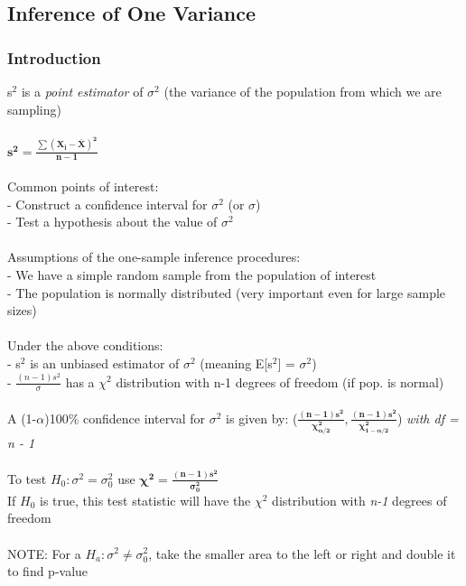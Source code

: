 \documentclass[12pt, a4paper]{article}
\begin{document}
	\subsection{Inference of One Variance}
	\subsubsection{Introduction}
	s$^2$ is a \textit{point estimator} of $\sigma^2$ (the variance of the population from which we are sampling) \\~\\
	\large $\bm{s^2 = \frac{\sum(X_i-\bar{X})^2}{n-1}}$ \normalsize \\~\\
	Common points of interest: \\
	- Construct a confidence interval for $\sigma^2$ (or $\sigma$) \\
	- Test a hypothesis about the value of $\sigma^2$ \\~\\
	Assumptions of the one-sample inference procedures: \\
	- We have a simple random sample from the population of interest \\
	- The population is normally distributed (very important even for large sample sizes) \\~\\
	Under the above conditions: \\
	- s$^2$ is an unbiased estimator of $\sigma^2$ (meaning E[s$^2$] = $\sigma^2$) \\
	- $\frac{(n-1)s^2}{\sigma}$ has a $\chi^2$ distribution with n-1 degrees of freedom (if pop. is normal) \\~\\
	A (1-$\alpha$)100\% confidence interval for $\sigma^2$ is given by: \large ($\bm{\frac{(n-1)s^2}{\chi^2_{\alpha/2}}, \frac{(n-1)s^2}{\chi^2_{1-\alpha/2}}}$) \normalsize \textit{with df = n - 1}\\~\\
	To test $H_0: \sigma^2 = \sigma^2_0$ use $\bm{\chi^2 = \frac{(n-1)s^2}{\sigma^2_0}}$ \\ If $H_0$ is true, this test statistic will have the $\chi^2$ distribution with \textit{n-1} degrees of freedom \\~\\
	NOTE: For a $H_a: \sigma^2 \neq \sigma^2_0$, take the smaller area to the left or right and double it to find p-value \\~\\
\end{document}
